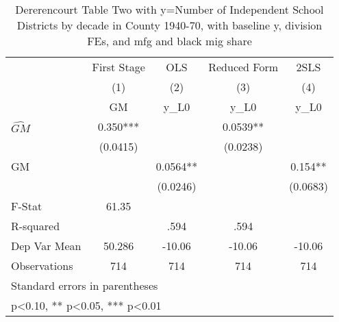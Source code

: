 \begin{table}[htbp]\centering
\def\sym#1{\ifmmode^{#1}\else\(^{#1}\)\fi}
\caption{Dererencourt Table Two with y=Number of Independent School Districts by decade in County 1940-70, with baseline y, division FEs, and mfg and black mig share}
\begin{tabular}{l*{4}{c}}
\toprule
                    & First Stage   &         OLS   &Reduced Form   &        2SLS   \\
                    &\multicolumn{1}{c}{(1)}&\multicolumn{1}{c}{(2)}&\multicolumn{1}{c}{(3)}&\multicolumn{1}{c}{(4)}\\
                    &\multicolumn{1}{c}{GM}&\multicolumn{1}{c}{y\_L0}&\multicolumn{1}{c}{y\_L0}&\multicolumn{1}{c}{y\_L0}\\
\midrule
$\hat{GM}$          &       0.350***&               &      0.0539** &               \\
                    &    (0.0415)   &               &    (0.0238)   &               \\
\addlinespace
GM                  &               &      0.0564** &               &       0.154** \\
                    &               &    (0.0246)   &               &    (0.0683)   \\
\midrule
F-Stat              &       61.35   &               &               &               \\
R-squared           &               &        .594   &        .594   &               \\
Dep Var Mean        &      50.286   &      -10.06   &      -10.06   &      -10.06   \\
Observations        &         714   &         714   &         714   &         714   \\
\bottomrule
\multicolumn{5}{l}{\footnotesize Standard errors in parentheses}\\
\multicolumn{5}{l}{\footnotesize * p<0.10, ** p<0.05, *** p<0.01}\\
\end{tabular}
\end{table}
